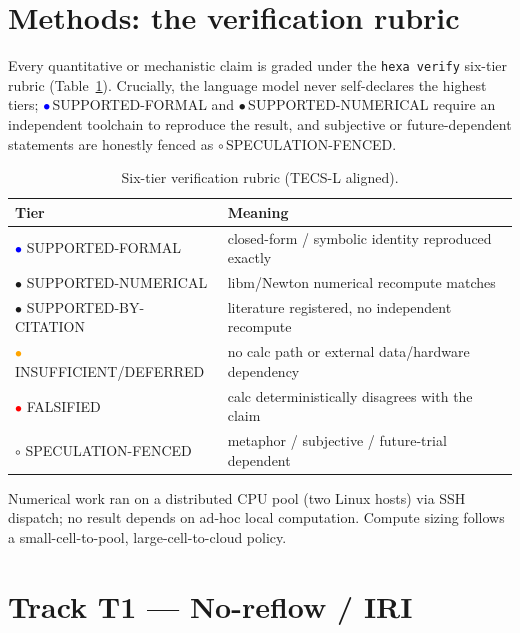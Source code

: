 \documentclass[11pt]{article}
\begin{document}
\section{Methods: the verification rubric}
\label{sec:methods}

Every quantitative or mechanistic claim is graded under the \texttt{hexa verify} six-tier rubric (Table~\ref{tab:rubric}). Crucially, the language model never self-declares the highest tiers; \textcolor{blue}{$\bullet$}\,SUPPORTED-FORMAL and \textcolor{green!60!black}{$\bullet$}\,SUPPORTED-NUMERICAL require an independent toolchain to reproduce the result, and subjective or future-dependent statements are honestly fenced as $\circ$\,SPECULATION-FENCED.

\begin{table}[h]
\centering
\caption{Six-tier verification rubric (TECS-L aligned).}
\label{tab:rubric}
\begin{tabular}{ll}
\toprule
Tier & Meaning \\
\midrule
\textcolor{blue}{$\bullet$} SUPPORTED-FORMAL & closed-form / symbolic identity reproduced exactly \\
\textcolor{green!60!black}{$\bullet$} SUPPORTED-NUMERICAL & libm/Newton numerical recompute matches \\
\textcolor{yellow!70!black}{$\bullet$} SUPPORTED-BY-CITATION & literature registered, no independent recompute \\
\textcolor{orange}{$\bullet$} INSUFFICIENT/DEFERRED & no calc path or external data/hardware dependency \\
\textcolor{red}{$\bullet$} FALSIFIED & calc deterministically disagrees with the claim \\
$\circ$ SPECULATION-FENCED & metaphor / subjective / future-trial dependent \\
\bottomrule
\end{tabular}
\end{table}

Numerical work ran on a distributed CPU pool (two Linux hosts) via SSH dispatch; no result depends on ad-hoc local computation. Compute sizing follows a small-cell-to-pool, large-cell-to-cloud policy.

\section{Track T1 --- No-reflow / IRI}
\label{sec:noreflow}
\end{document}
